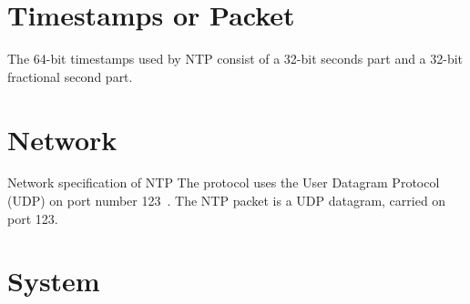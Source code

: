 \section{Timestamps or Packet}
The 64-bit timestamps used by NTP consist of a 32-bit seconds part and a 32-bit fractional second part.

\section{Network}\label{sec:ntp-network}
Network specification of NTP 
The protocol uses the User Datagram Protocol (UDP) on port number 123~\cite{ianna-ports}.
The NTP packet is a UDP datagram, carried on port 123.

\section{System}
